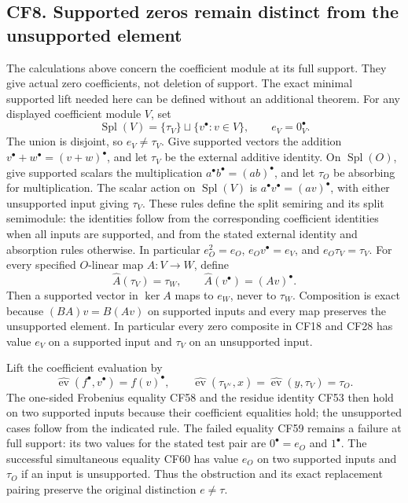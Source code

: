 \subsection{CF8. Supported zeros remain distinct from the unsupported element}\label{cf8.-supported-zeros-remain-distinct-from-the-unsupported-element}

The calculations above concern the coefficient module at its full support. They give actual zero coefficients, not deletion of support. The exact minimal supported lift needed here can be defined without an additional theorem. For any displayed coefficient module \(V\), set
\[
 \operatorname{Spl}(V)=\{\tau_V\}\sqcup\{v^\bullet:v\in V\},
 \qquad e_V=0_V^\bullet.
 \tag{CF65}
\]
The union is disjoint, so \(e_V\neq\tau_V\). Give supported vectors the addition \(v^\bullet+w^\bullet=(v+w)^\bullet\), and let \(\tau_V\) be the external additive identity. On \(\operatorname{Spl}(O)\), give supported scalars the multiplication \(a^\bullet b^\bullet=(ab)^\bullet\), and let \(\tau_O\) be absorbing for multiplication. The scalar action on \(\operatorname{Spl}(V)\) is \(a^\bullet v^\bullet=(av)^\bullet\), with either unsupported input giving \(\tau_V\). These rules define the split semiring and its split semimodule: the identities follow from the corresponding coefficient identities when all inputs are supported, and from the stated external identity and absorption rules otherwise. In particular \(e_O^2=e_O\), \(e_Ov^\bullet=e_V\), and \(e_O\tau_V=\tau_V\). For every specified \(O\)-linear map \(A:V\to W\), define
\[
 \widehat A(\tau_V)=\tau_W,
 \qquad \widehat A(v^\bullet)=(Av)^\bullet.
 \tag{CF66}
\]
Then a supported vector in \(\ker A\) maps to \(e_W\), never to \(\tau_W\). Composition is exact because \((BA)v=B(Av)\) on supported inputs and every map preserves the unsupported element. In particular every zero composite in CF18 and CF28 has value \(e_V\) on a supported input and \(\tau_V\) on an unsupported input.

Lift the coefficient evaluation by
\[
 \widehat{\operatorname{ev}}(f^\bullet,v^\bullet)
 =f(v)^\bullet,
 \qquad
 \widehat{\operatorname{ev}}(\tau_{V^\vee},x)
 =\widehat{\operatorname{ev}}(y,\tau_V)=\tau_O.
 \tag{CF67}
\]
The one-sided Frobenius equality CF58 and the residue identity CF53 then hold on two supported inputs because their coefficient equalities hold; the unsupported cases follow from the indicated rule. The failed equality CF59 remains a failure at full support: its two values for the stated test pair are \(0^\bullet=e_O\) and \(1^\bullet\). The successful simultaneous equality CF60 has value \(e_O\) on two supported inputs and \(\tau_O\) if an input is unsupported. Thus the obstruction and its exact replacement pairing preserve the original distinction \(e\neq\tau\).


